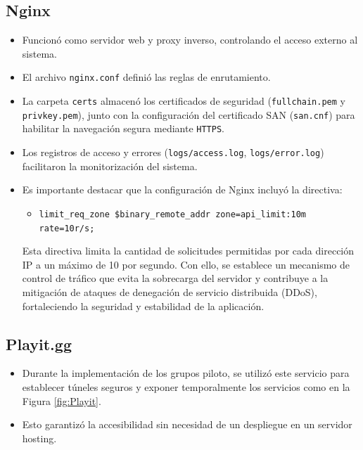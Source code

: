 \documentclass[letter,oneside,12pt,spanish]{report}
\begin{document}
\subsection{Nginx}
\begin{itemize}
    \item Funcionó como servidor web y proxy inverso, controlando el acceso externo al sistema.
    \item El archivo \texttt{nginx.conf} definió las reglas de enrutamiento.
    \item La carpeta \texttt{certs} almacenó los certificados de seguridad (\texttt{fullchain.pem} y \texttt{privkey.pem}), junto con la configuración del certificado SAN (\texttt{san.cnf}) para habilitar la navegación segura mediante \texttt{HTTPS}.
    \item Los registros de acceso y errores (\texttt{logs/access.log}, \texttt{logs/error.log}) facilitaron la monitorización del sistema.
	\item Es importante destacar que la configuración de Nginx incluyó la directiva:
    
    \begin{itemize}
        \item \texttt{limit\_req\_zone \$binary\_remote\_addr zone=api\_limit:10m rate=10r/s;}
    \end{itemize}
    
    Esta directiva limita la cantidad de solicitudes permitidas por cada dirección IP a un máximo de 10 por segundo. Con ello, se establece un mecanismo de control de tráfico que evita la sobrecarga del servidor y contribuye a la mitigación de ataques de denegación de servicio distribuida (DDoS), fortaleciendo la seguridad y estabilidad de la aplicación.
\end{itemize}

\subsection{Playit.gg}
\begin{itemize}
    \item Durante la implementación de los grupos piloto, se utilizó este servicio para establecer túneles seguros y exponer temporalmente los servicios como en la Figura \ref{fig:Playit}.

	\item Esto garantizó la accesibilidad sin necesidad de un despliegue en un servidor hosting.
\end{itemize}
\end{document}
